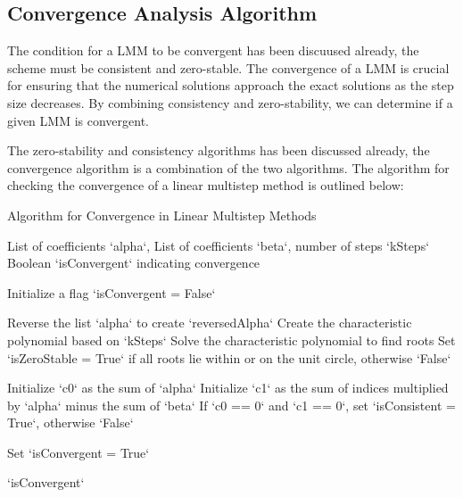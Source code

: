 \subsection{Convergence Analysis Algorithm}
The condition for a LMM to be convergent has been discuused already, the scheme must be consistent and zero-stable. The convergence of a LMM is crucial for ensuring that the numerical solutions approach the exact solutions as the step size decreases. By combining consistency and zero-stability, we can determine if a given LMM is convergent.

The zero-stability and consistency algorithms has been discussed already, the convergence algorithm is a combination of the two algorithms. The algorithm for checking the convergence of a linear multistep method is outlined below:

\begin{algorithm}
   \caption{Algorithm for Convergence in Linear Multistep Methods}
   \label{alg:convergence}
   
   \begin{algorithmic}[1] %
   
   \REQUIRE List of coefficients `alpha`, List of coefficients `beta`, number of steps `kSteps`
   \ENSURE Boolean `isConvergent` indicating convergence
   
   \STATE Initialize a flag `isConvergent = False`
   
   \STATE Reverse the list `alpha` to create `reversedAlpha`
   \STATE Create the characteristic polynomial based on `kSteps`
   \STATE Solve the characteristic polynomial to find roots
   \STATE Set `isZeroStable = True` if all roots lie within or on the unit circle, otherwise `False`
   
   \STATE Initialize `c0` as the sum of `alpha`
   \STATE Initialize `c1` as the sum of indices multiplied by `alpha` minus the sum of `beta`
   \STATE If `c0 == 0` and `c1 == 0`, set `isConsistent = True`, otherwise `False`
   
       \STATE Set `isConvergent = True`
   \ENDIF
   
   \RETURN `isConvergent`
   
   \end{algorithmic}
   \end{algorithm}



